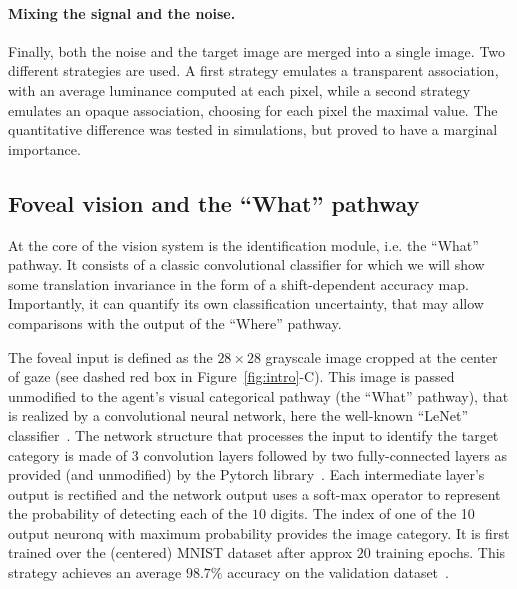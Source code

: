 \paragraph{Mixing the signal and the noise.} Finally, both the noise and the target image are merged into a single image. Two different strategies are used. A first strategy emulates a transparent association, with an average luminance computed at each pixel, while a second strategy emulates an opaque association, choosing for each pixel the maximal value. The quantitative difference was tested in simulations, but proved to have a marginal importance.
%
\subsection*{Foveal vision and the ``What'' pathway}
%
At the core of the vision system is the identification module, i.e. the ``What'' pathway. It consists of a classic convolutional classifier for which we will show some translation invariance in the form of a shift-dependent accuracy map. Importantly, it can quantify its own classification uncertainty, that may allow comparisons with the output of the ``Where'' pathway.

The foveal input is defined as the $28\times 28$ grayscale image cropped at the center of gaze (see dashed red box in Figure~\ref{fig:intro}-C).
This image is passed unmodified to the agent's visual categorical pathway (the ``What'' pathway), that is realized by a convolutional neural network, here the well-known ``LeNet'' classifier~\cite{Lecun1998}. The network structure that processes the input to identify the target category is made of 3 convolution layers followed by two fully-connected layers as provided (and unmodified) by the Pytorch library~\cite{NEURIPS2019_9015}. Each intermediate layer's output is rectified and
the network output uses a soft-max operator to represent the probability of detecting each of the $10$ digits. The index of one of the 10 output neuronq with maximum probability provides the image category.
It is first trained over the (centered) MNIST dataset after approx $20$ training epochs. %
This strategy achieves an average $98.7\%$ accuracy on the validation dataset~\cite{Lecun1998}.%

